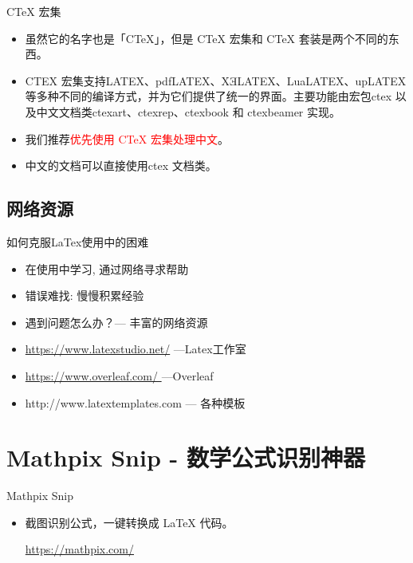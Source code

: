 \documentclass[13pt]{ctexbeamer}
\newcommand{\red}[1]{\textcolor{red}{#1}}
\begin{document}
\begin{frame}{CTeX 宏集}
	\begin{itemize}
		\item 
		虽然它的名字也是「CTeX」，但是 CTeX 宏集和 CTeX 套装是两个不同的东西。
		\item  CTEX 宏集支持LATEX、pdfLATEX、XƎLATEX、LuaLATEX、upLATEX 等多种不同的编译方式，并为它们提供了统一的界面。主要功能由宏包ctex 以及中文文档类ctexart、ctexrep、ctexbook 和 ctexbeamer 实现。
		\item 我们推荐\red{优先使用 CTeX 宏集处理中文}。
		\item 中文的文档可以直接使用ctex 文档类。
	\end{itemize}
	
	
\end{frame}



\subsection{网络资源}




\begin{frame}{如何克服LaTex使用中的困难}
	\begin{itemize}
\item 	  在使用中学习, 通过网络寻求帮助

\item 	  错误难找: 慢慢积累经验

\item 	  遇到问题怎么办？---  丰富的网络资源

	\end{itemize}

	
\begin{itemize}
    \item 
    \href{https://www.latexstudio.net/}{https://www.latexstudio.net/}    ---Latex工作室  
    \item 
    \href{https://www.overleaf.com/
}{https://www.overleaf.com/
}   ---Overleaf  
\item 
http://www.latextemplates.com --- 各种模板

\end{itemize}
\end{frame} 
  

\section{Mathpix Snip - 数学公式识别神器}
\begin{frame}{Mathpix Snip}
\begin{itemize}
	\item 截图识别公式，一键转换成 LaTeX 代码。
	
\href{https://mathpix.com/}{https://mathpix.com/}
\end{itemize}
\end{frame} 
\end{document}

